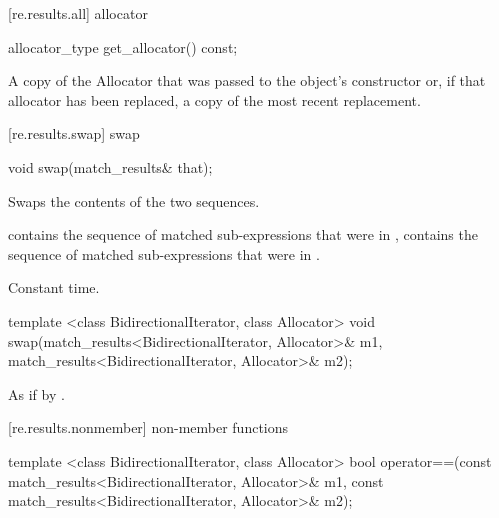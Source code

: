 [re.results.all]{ allocator}%

%
%
\begin{itemdecl}
allocator_type get_allocator() const;
\end{itemdecl}

\begin{itemdescr}
\pnum
\returns A copy of the Allocator that was passed to the object's constructor or, if that
allocator has been replaced, a copy of the most recent replacement.
\end{itemdescr}

[re.results.swap]{ swap}

%
%
\begin{itemdecl}
void swap(match_results& that); 
\end{itemdecl}

\begin{itemdescr}
\pnum\effects  Swaps the contents of the two sequences. 

\pnum\postcondition  {} contains the sequence of matched
sub-expressions that were in ,  contains the
sequence of matched sub-expressions that were in .

\pnum\complexity Constant time. 
\end{itemdescr}

%
%
\begin{itemdecl}
template <class BidirectionalIterator, class Allocator>
  void swap(match_results<BidirectionalIterator, Allocator>& m1,
            match_results<BidirectionalIterator, Allocator>& m2);
\end{itemdecl}

\pnum\effects As if by .

[re.results.nonmember]{ non-member functions}

%
%
\begin{itemdecl}
template <class BidirectionalIterator, class Allocator>
bool operator==(const match_results<BidirectionalIterator, Allocator>& m1,
                const match_results<BidirectionalIterator, Allocator>& m2);
\end{itemdecl}

